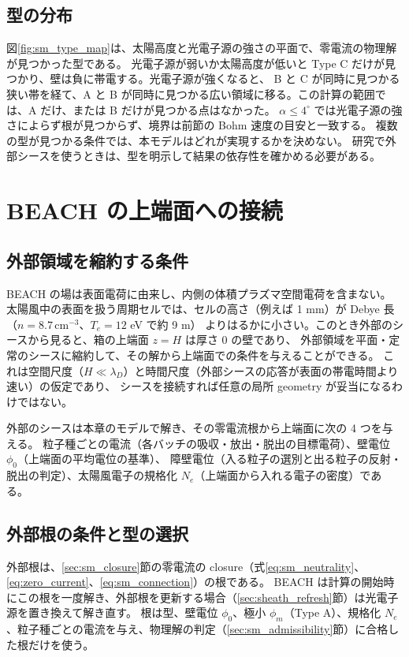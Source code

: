 

\subsection{型の分布}
図\ref{fig:sm_type_map}は、太陽高度と光電子源の強さの平面で、零電流の物理解が見つかった型である。
光電子源が弱いか太陽高度が低いと Type C だけが見つかり、壁は負に帯電する。光電子源が強くなると、
B と C が同時に見つかる狭い帯を経て、A と B が同時に見つかる広い領域に移る。この計算の範囲では、A だけ、または B だけが見つかる点はなかった。
$\alpha\le4^\circ$ では光電子源の強さによらず根が見つからず、境界は前節の Bohm 速度の目安と一致する。
複数の型が見つかる条件では、本モデルはどれが実現するかを決めない。
研究で外部シースを使うときは、型を明示して結果の依存性を確かめる必要がある。



\section{BEACH の上端面への接続}
\label{sec:sm_coupling}

\subsection{外部領域を縮約する条件}
BEACH の場は表面電荷に由来し、内側の体積プラズマ空間電荷を含まない。
太陽風中の表面を扱う周期セルでは、セルの高さ（例えば 1 mm）が Debye 長（$n=8.7\,\mathrm{cm^{-3}}$、$T_e=12$ eV で約 9 m）
よりはるかに小さい。このとき外部のシースから見ると、箱の上端面 $z=H$ は厚さ 0 の壁であり、
外部領域を平面・定常のシースに縮約して、その解から上端面での条件を与えることができる。
これは空間尺度（$H\ll\lambda_D$）と時間尺度（外部シースの応答が表面の帯電時間より速い）の仮定であり、
シースを接続すれば任意の局所 geometry が妥当になるわけではない。

外部のシースは本章のモデルで解き、その零電流根から上端面に次の 4 つを与える。
粒子種ごとの電流（各バッチの吸収・放出・脱出の目標電荷）、壁電位 $\phi_0$（上端面の平均電位の基準）、
障壁電位（入る粒子の選別と出る粒子の反射・脱出の判定）、太陽風電子の規格化 $N_e$（上端面から入れる電子の密度）である。

\subsection{外部根の条件と型の選択}
外部根は、\ref{sec:sm_closure}節の零電流の closure（式\eqref{eq:sm_neutrality}、\eqref{eq:zero_current}、\eqref{eq:sm_connection}）の根である。
BEACH は計算の開始時にこの根を一度解き、外部根を更新する場合（\ref{sec:sheath_refresh}節）は光電子源を置き換えて解き直す。
根は型、壁電位 $\phi_0$、極小 $\phi_m$（Type A）、規格化 $N_e$、粒子種ごとの電流を与え、物理解の判定（\ref{sec:sm_admissibility}節）に合格した根だけを使う。

